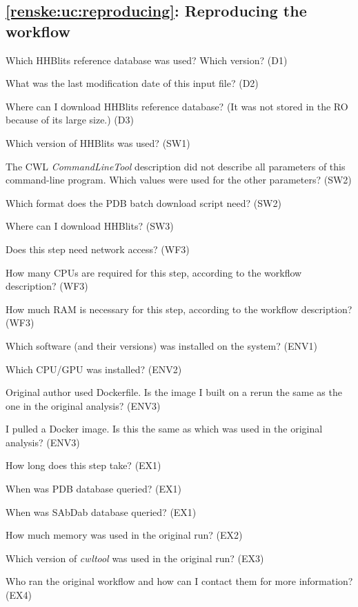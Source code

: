 \subsection{\ref{renske:uc:reproducing}: Reproducing the workflow}

\begin{provquestions}[resume]
    \item Which HHBlits reference database was used? Which version? (D1)
    \item What was the last modification date of this input file? (D2)
    \item Where can I download HHBlits reference database? (It was not stored in the RO because of its large size.) (D3)
    \item Which version of HHBlits was used? (SW1)
    \item The CWL \emph{CommandLineTool} description did not describe all parameters of this command-line program. Which values were used for the other parameters? (SW2)
    \item Which format does the PDB batch download script need? (SW2)
    \item Where can I download HHBlits? (SW3)
    \item Does this step need network access? (WF3)
    \item How many CPUs are required for this step, according to the workflow description? (WF3)
    \item How much RAM is necessary for this step, according to the workflow description? (WF3)
    \item Which software (and their versions) was installed on the system? (ENV1) 
    \item Which CPU/GPU was installed? (ENV2)
    \item Original author used Dockerfile. Is the image I built on a rerun the same as the one in the original analysis?  (ENV3)
    \item I pulled a Docker image. Is this the same as which was used in the original analysis? (ENV3)
    \item How long does this step take? (EX1)
    \item When was PDB database queried? (EX1)
    \item When was SAbDab database queried? (EX1)
    \item How much memory was used in the original run? (EX2)
    \item Which version of \emph{cwltool} was used in the original run? (EX3)
    \item Who ran the original workflow and how can I contact them for more information? (EX4)
\end{provquestions}

